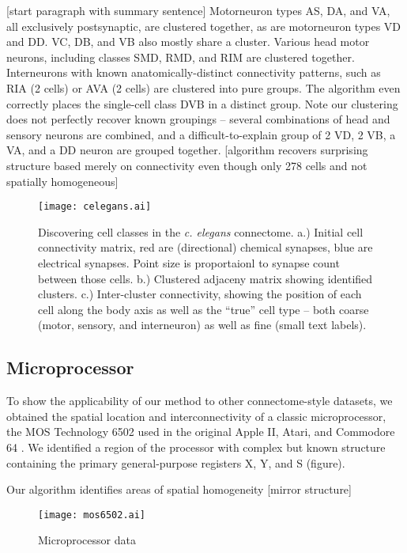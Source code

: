 \documentclass{article}
\begin{document}
[start paragraph with summary sentence] Motorneuron types AS, DA, and
VA, all exclusively postsynaptic, are clustered together, as are
motorneuron types VD and DD. VC, DB, and VB also mostly share a
cluster. Various head motor neurons, including classes SMD, RMD, and
RIM are clustered together. Interneurons with known
anatomically-distinct connectivity patterns, such as RIA (2 cells) or
AVA (2 cells) are clustered into pure groups. The algorithm even
correctly places the single-cell class DVB in a distinct group. Note
our clustering does not perfectly recover known groupings -- several
combinations of head and sensory neurons are combined, and a
difficult-to-explain group of 2 VD, 2 VB, a VA, and a DD neuron are
grouped together. [algorithm recovers surprising structure based
merely on connectivity even though only 278 cells and not spatially
homogeneous]


\begin{figure}
  \centering 
  \centerline{\texttt{[image: celegans.ai]}}
  \caption{Discovering cell classes in the \textit{c. elegans}
    connectome. a.) Initial cell connectivity matrix, red are
    (directional) chemical synapses, blue are electrical
    synapses. Point size is proportaionl to synapse count between
    those cells. b.) Clustered adjaceny matrix showing identified
    clusters. c.) Inter-cluster connectivity, showing the position of
    each cell along the body axis as well as the ``true'' cell type --
    both coarse (motor, sensory, and interneuron) as well as fine
    (small text labels). }
\end{figure}

\subsection{Microprocessor}

To show the applicability of our method to other connectome-style
datasets, we obtained the spatial location and interconnectivity of a
classic microprocessor, the MOS Technology 6502 used in the original
Apple II, Atari, and Commodore 64 \autocite{datasource}. We identified a
region of the processor with complex but known structure containing
the primary general-purpose registers X, Y, and S (figure).

Our algorithm identifies areas of spatial homogeneity 
[mirror structure] 


\begin{figure}
  \centering 
  \centerline{\texttt{[image: mos6502.ai]}}
  \caption{Microprocessor data}
\end{figure}
\end{document}

